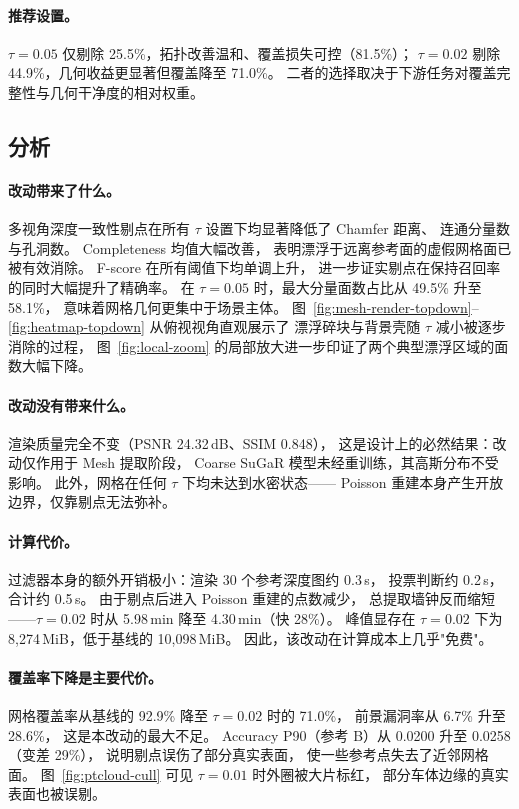 \paragraph{推荐设置。}
$\tau{=}0.05$ 仅剔除 25.5\%，拓扑改善温和、覆盖损失可控（81.5\%）；
$\tau{=}0.02$ 剔除 44.9\%，几何收益更显著但覆盖降至 71.0\%。
二者的选择取决于下游任务对覆盖完整性与几何干净度的相对权重。

\subsection{分析}
\label{ssec:analysis}

\paragraph{改动带来了什么。}
多视角深度一致性剔点在所有 $\tau$ 设置下均显著降低了 Chamfer 距离、
连通分量数与孔洞数。
Completeness 均值大幅改善，
表明漂浮于远离参考面的虚假网格面已被有效消除。
F-score 在所有阈值下均单调上升，
进一步证实剔点在保持召回率的同时大幅提升了精确率。
在 $\tau{=}0.05$ 时，最大分量面数占比从 49.5\% 升至 58.1\%，
意味着网格几何更集中于场景主体。
图~\ref{fig:mesh-render-topdown}--\ref{fig:heatmap-topdown} 从俯视视角直观展示了
漂浮碎块与背景壳随 $\tau$ 减小被逐步消除的过程，
图~\ref{fig:local-zoom} 的局部放大进一步印证了两个典型漂浮区域的面数大幅下降。

\paragraph{改动没有带来什么。}
渲染质量完全不变（PSNR 24.32\,dB、SSIM 0.848），
这是设计上的必然结果：改动仅作用于 Mesh 提取阶段，
Coarse SuGaR 模型未经重训练，其高斯分布不受影响。
此外，网格在任何 $\tau$ 下均未达到水密状态——
Poisson 重建本身产生开放边界，仅靠剔点无法弥补。

\paragraph{计算代价。}
过滤器本身的额外开销极小：渲染 30 个参考深度图约 0.3\,s，
投票判断约 0.2\,s，合计约 0.5\,s。
由于剔点后进入 Poisson 重建的点数减少，
总提取墙钟反而缩短——$\tau{=}0.02$ 时从 5.98\,min 降至 4.30\,min（快 28\%）。
峰值显存在 $\tau{=}0.02$ 下为 8{,}274\,MiB，低于基线的 10{,}098\,MiB。
因此，该改动在计算成本上几乎"免费"。

\paragraph{覆盖率下降是主要代价。}
网格覆盖率从基线的 92.9\% 降至 $\tau{=}0.02$ 时的 71.0\%，
前景漏洞率从 6.7\% 升至 28.6\%，
这是本改动的最大不足。
Accuracy P90（参考 B）从 0.0200 升至 0.0258（变差 29\%），
说明剔点误伤了部分真实表面，
使一些参考点失去了近邻网格面。
图~\ref{fig:ptcloud-cull} 可见 $\tau{=}0.01$ 时外圈被大片标红，
部分车体边缘的真实表面也被误剔。
